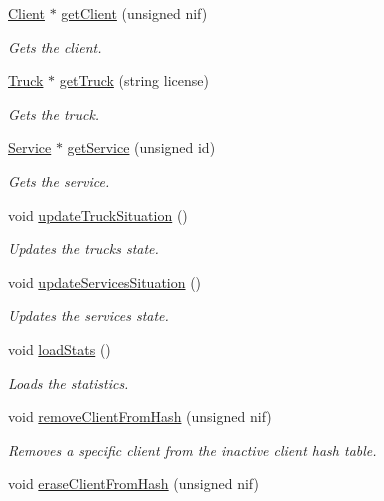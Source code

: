 \begin{DoxyCompactItemize}
\hyperlink{class_client}{Client} $\ast$ \hyperlink{class_company_ae8efdaf521467fd204c8d272f4469679}{get\+Client} (unsigned nif)
\begin{DoxyCompactList}\small\item\em Gets the client. \end{DoxyCompactList}\item 
\hyperlink{class_truck}{Truck} $\ast$ \hyperlink{class_company_acb9c7285e4ca619899017bd1221a1d27}{get\+Truck} (string license)
\begin{DoxyCompactList}\small\item\em Gets the truck. \end{DoxyCompactList}\item 
\hyperlink{class_service}{Service} $\ast$ \hyperlink{class_company_acf80072e8abec3e359387243d8cdc49f}{get\+Service} (unsigned id)
\begin{DoxyCompactList}\small\item\em Gets the service. \end{DoxyCompactList}\item 
void \hyperlink{class_company_af058ee612ca75f1bbd6507e078e5de0a}{update\+Truck\+Situation} ()
\begin{DoxyCompactList}\small\item\em Updates the truck\textquotesingle{}s state. \end{DoxyCompactList}\item 
void \hyperlink{class_company_ae5ce2e4c8d26951b71ca73c7589f6875}{update\+Services\+Situation} ()
\begin{DoxyCompactList}\small\item\em Updates the services\textquotesingle{} state. \end{DoxyCompactList}\item 
void \hyperlink{class_company_a1e471fb69b7924e03cfdc01c3692f26c}{load\+Stats} ()
\begin{DoxyCompactList}\small\item\em Loads the statistics. \end{DoxyCompactList}\item 
void \hyperlink{class_company_a3bf95c042bb55a3096871ac861f58f8f}{remove\+Client\+From\+Hash} (unsigned nif)
\begin{DoxyCompactList}\small\item\em Removes a specific client from the inactive client hash table. \end{DoxyCompactList}\item 
void \hyperlink{class_company_aab30d8d03d868006bb277fc8ead1c510}{erase\+Client\+From\+Hash} (unsigned nif)

\end{DoxyCompactItemize}
